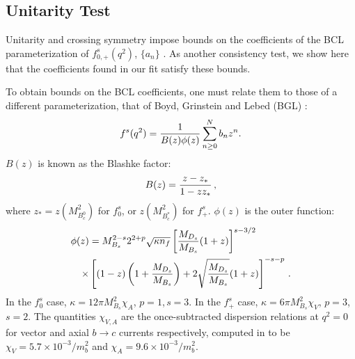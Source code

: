 \FloatBarrier

\subsection{Unitarity Test}

Unitarity and crossing symmetry impose bounds on the coefficients of the BCL parameterization of $f^s_{0,+}(q^2)$, $\{a_n\}$ \cite{PhysRevD.4.725,PhysRevD.3.2807}. As another consistency test, we show here that the coefficients found in our fit satisfy these bounds.

To obtain bounds on the BCL coefficients, one must relate them to those of a different parameterization, that of Boyd, Grinstein and Lebed (BGL) \cite{GLENNBOYD1996493}:
\begin{align}
  f^s(q^2) = {1\over B(z)\phi(z)} \sum^N_{n\geq 0} b_n z^n.
\end{align}
$B(z)$ is known as the Blashke factor:
\begin{align}
  B(z) = { z - z_* \over 1 - z z_* }\,,
\end{align}
where $z_* = z(M^2_{B_c^0})$ for $f_0^s$, or $z(M^2_{B_c^*})$ for $f_+^s$. $\phi(z)$ is the outer function:
\begin{align}
  \phi(z) &= M_{B_s}^{2-s} 2^{2+p} \sqrt{\kappa n_f}
  \left[ {M_{D_s}\over M_{B_s}} (1+z)\right]^{s-3/2} \nonumber \\
  \times &\left[ (1-z)\left(1+{M_{D_s}\over M_{B_s}}\right)+2\sqrt{M_{D_s}\over M_{B_s}}(1+z)\right]^{-s-p}\,.
\end{align}
In the $f^s_0$ case, $\kappa=12\pi M^2_{B_s}\chi_A$, $p=1$,\,$s=3$. In the $f^s_+$ case, $\kappa=6\pi M^2_{B_s} \chi_V$, $p=3$,\,$s=2$. The quantities $\chi_{V,A}$ are the once-subtracted dispersion relations at $q^2=0$ for vector and axial $b\to c$ currents respectively, computed in \cite{GLENNBOYD1996493} to be $\chi_V = 5.7\times 10^{-3}/m_b^2$ and $\chi_A = 9.6\times 10^{-3}/m_b^2$.

